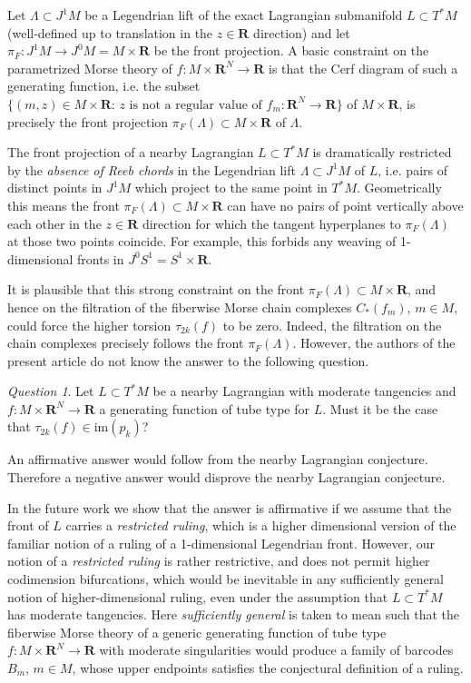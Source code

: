 \documentclass{amsart}
\def\bR{\mathbf{R}}
\theoremstyle{definition}
\theoremstyle{remark}
\newtheorem{inductive lemma}[theorem]{Inductive Lemma}
\newtheorem{question}[theorem]{Question}
\begin{document}
Let $\Lambda \subset J^1M$ be a Legendrian lift of the exact Lagrangian submanifold $L \subset T^*M$ (well-defined up to translation in the $z \in \bR$ direction) and let  $\pi_F:J^1M \to J^0M = M \times \bR$ be the front projection. A basic constraint on the parametrized Morse theory of $f:M \times \bR^N \to \bR$  is that the Cerf diagram of such a generating function, i.e. the subset $\{(m,z) \in M \times \bR : \, \text{$z$ is not a regular value of $f_m:\bR^N \to \bR$} \} $ of $M \times \bR$, is precisely the front projection $\pi_{F}(\Lambda) \subset  M \times \bR$ of $\Lambda$.

The front projection of a nearby Lagrangian $L \subset T^*M$ is dramatically restricted by the {\em absence of Reeb chords} in the Legendrian lift $\Lambda \subset J^1M$ of $L$, i.e. pairs of distinct points in $J^1M$ which project to the same point in $T^*M$. Geometrically this means the front $\pi_F(\Lambda) \subset M \times \bR$ can have no pairs of point vertically above each other in the $z \in \bR$ direction for which the tangent hyperplanes to $\pi_F(\Lambda)$ at those two points coincide. For example, this forbids any weaving of 1-dimensional fronts in $J^0S^1=S^1 \times \bR$. 

It is plausible that this strong constraint on the front $\pi_F(\Lambda) \subset M \times \bR$, and hence on the filtration of the fiberwise Morse chain complexes $C_*(f_m)$, $m \in M$, could force the higher torsion $\tau_{2k}(f)$ to be zero. Indeed, the filtration on the chain complexes precisely follows the front $\pi_F(\Lambda)$. However, the authors of the present article do not know the answer to the following question.

\begin{question} Let $L \subset T^*M$ be a nearby Lagrangian with moderate tangencies and $f:M \times \bR^N \to \bR$ a generating function of tube type for $L$. Must it be the case that $\tau_{2k}(f) \in \text{im}(p_k)$? \end{question}

An affirmative answer would follow from the nearby Lagrangian conjecture. Therefore a negative answer would disprove the nearby Lagrangian conjecture. 

In the future work \cite{AIS} we show that the answer is affirmative if we assume that the front of $L$ carries a {\em restricted ruling}, which is a higher dimensional version of the familiar notion of a ruling of a 1-dimensional Legendrian front. However, our notion of a {\em restricted ruling} is rather restrictive, and does not permit higher codimension bifurcations, which would be inevitable in any sufficiently general notion of higher-dimensional ruling, even under the assumption that $L \subset T^*M$ has moderate tangencies. Here {\em sufficiently general} is taken to mean such that the fiberwise Morse theory of a generic generating function of tube type $f:M \times \bR^N \to \bR$ with moderate singularities would produce a family of barcodes $B_m$, $m \in M$, whose upper endpoints satisfies the conjectural definition of a ruling.
\end{document}
